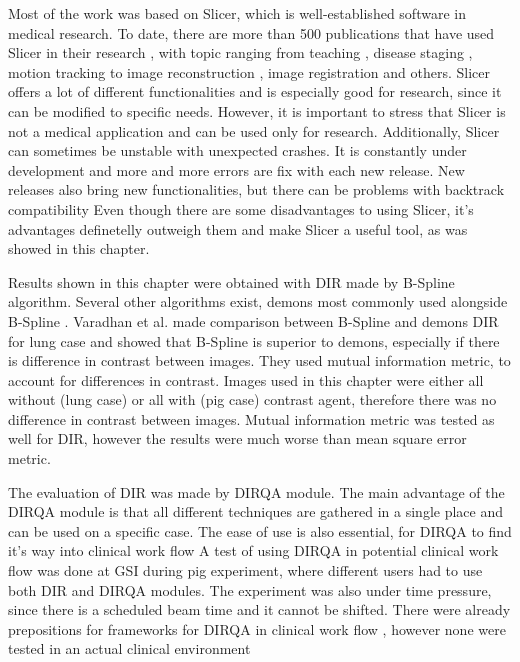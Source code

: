 \documentclass[type=dr, dr=rernat, accentcolor=tud7b,colorbacktitle, bigchapter, openright, twoside, 12pt ]{tudthesis}
\begin{document}
Most of the work was based on Slicer, which is well-established software in medical research. To date, there are more than 500 publications that have used Slicer in their research \cite{SlicerCitation}, with topic ranging from 
teaching \cite{Pujol2016}, disease staging \cite{Liu2016, Liu2015}, motion tracking \cite{Behringer2015} to image reconstruction \cite{Meyer2015}, image registration \cite{Li2015, Fedorov2015, Li2015b}
and others. Slicer offers a lot of different functionalities and is especially good for research, since it can be modified to specific needs. However, it is important to stress that Slicer 
is not a medical application and can be used only for research. Additionally, Slicer can sometimes be unstable with unexpected crashes. It is constantly under development and more and more errors
are fix with each new release. New releases also bring new functionalities, but there can be problems with backtrack compatibility Even though there are some disadvantages to using Slicer, it's advantages
definetelly outweigh them and make Slicer a useful tool, as was showed in this chapter.

Results shown in this chapter were obtained with DIR made by B-Spline algorithm. Several other algorithms exist, demons most commonly used alongside B-Spline \cite{Thirion1998}. Varadhan et al. made comparison
between B-Spline and demons DIR for lung case \cite{Varadhan2013} and showed that B-Spline is superior to demons, especially if there is difference in contrast between images. They used mutual information
metric, to account for differences in contrast. Images used in this chapter were either all without (lung case) or all with (pig case) contrast agent, therefore there was no difference in contrast
between images. Mutual information metric was tested as well for DIR, however the results were much worse than mean square error metric.

The evaluation of DIR was made by DIRQA module. The main advantage of the DIRQA module is that all different techniques are gathered in a single place and can be used on a specific case. The ease of use is also essential, for DIRQA to find it's way into clinical work flow
A test of using DIRQA in potential clinical work flow was done at GSI during pig experiment, where different users had to use both DIR and DIRQA modules. The experiment was also under time pressure, since there is
a scheduled beam time and it cannot be shifted. There were already prepositions for frameworks for DIRQA in clinical work flow \cite{Varadhan2013}, however none were tested in an actual clinical environment
\end{document}
